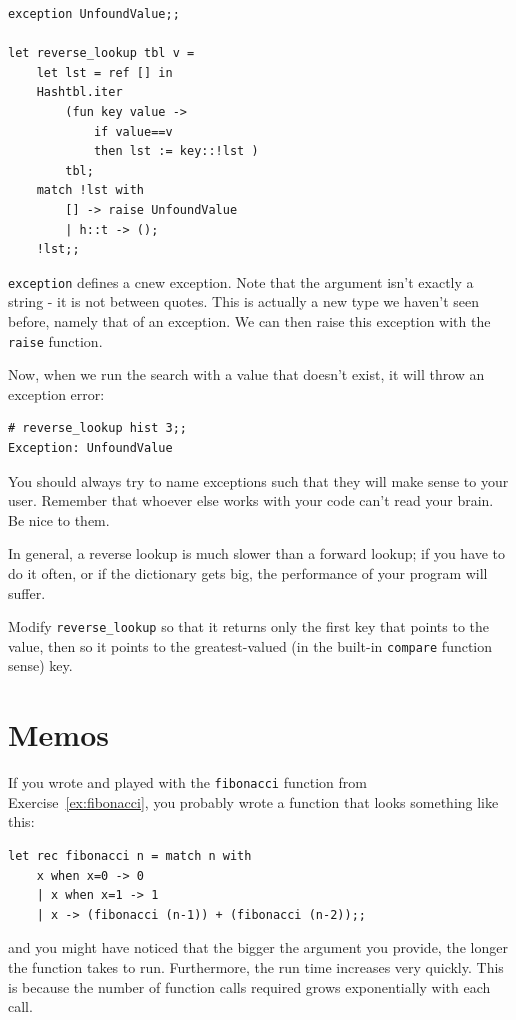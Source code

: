\documentclass[10pt]{book}
\begin{document}
{\beforeverb
\begin{verbatim}
exception UnfoundValue;;

let reverse_lookup tbl v = 
	let lst = ref [] in
	Hashtbl.iter
		(fun key value ->
			if value==v
			then lst := key::!lst )
		tbl;
	match !lst with
		[] -> raise UnfoundValue
		| h::t -> ();
	!lst;;
\end{verbatim}
\afterverb
{\tt exception} defines a cnew exception. Note that the argument isn't exactly a string - it is not between quotes. This is actually a new type we haven't seen before, namely that of an exception. We can then raise this exception with the {\tt raise} function.

Now, when we run the search with a value that doesn't exist, it will throw an exception error:

\beforeverb
\begin{verbatim}
# reverse_lookup hist 3;;
Exception: UnfoundValue
\end{verbatim}
\afterverb

You should always try to name exceptions such that they will make sense to your user. Remember that whoever else works with your code can't read your brain. Be nice to them.

In general, a reverse lookup is much slower than a forward lookup; if you
have to do it often, or if the dictionary gets big, the performance
of your program will suffer.

\begin{ex}
Modify \verb"reverse_lookup" so that it returns only the first key that points to the value, then so it points to the greatest-valued (in the built-in {\tt compare} function sense) key.
\end{ex}

\section{Memos}
If you wrote and played with the {\tt fibonacci} function from
Exercise~\ref{ex:fibonacci}, you probably wrote a function that looks something like this:
\beforeverb
\begin{verbatim}
let rec fibonacci n = match n with
	x when x=0 -> 0
	| x when x=1 -> 1
	| x -> (fibonacci (n-1)) + (fibonacci (n-2));;
\end{verbatim}
\afterverb
and you might have noticed that the bigger
the argument you provide, the longer the function takes to run.
Furthermore, the run time increases very quickly. This is because the
number of function calls required grows exponentially with each call.

}
\end{document}
